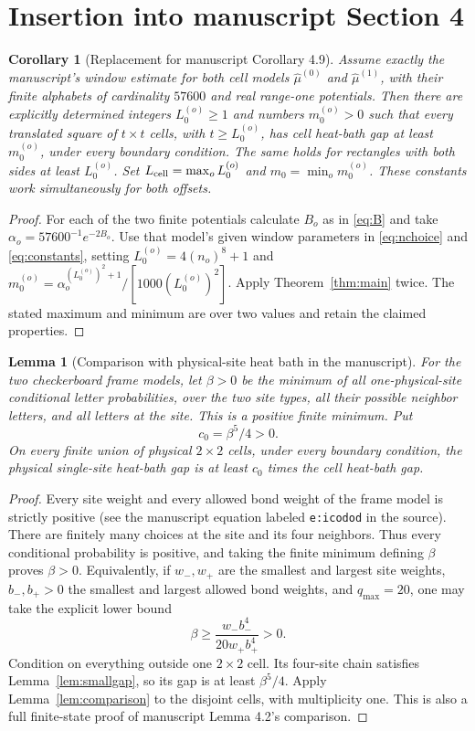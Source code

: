 \documentclass[11pt]{amsart}
\newtheorem{lemma}[theorem]{Lemma}
\newtheorem{corollary}[theorem]{Corollary}
\theoremstyle{definition}
\newcommand{\1}{\mathbf 1}
\begin{document}
\section{Insertion into manuscript Section 4}
\label{sec:application}

\begin{corollary}[Replacement for manuscript Corollary 4.9]
\label{cor:twooffsets}
Assume exactly the manuscript's window estimate for both cell models
$\widehat\mu^{(0)}$ and $\widehat\mu^{(1)}$, with their finite alphabets
of cardinality $57600$ and real range-one potentials.
Then there are explicitly determined integers $L_0^{(o)}\ge1$ and
numbers $m_0^{(o)}>0$ such that every translated square of $t\times t$
cells, with $t\ge L_0^{(o)}$, has cell heat-bath gap at least $m_0^{(o)}$,
under every boundary condition. The same holds for rectangles with both
sides at least $L_0^{(o)}$.
Set $L_{\rm cell}=\max_o L_0^{(o)}$ and
$m_0=\min_o m_0^{(o)}$. These constants work simultaneously for both
offsets.
\end{corollary}
\begin{proof}
For each of the two finite potentials calculate $B_o$ as in \eqref{eq:B}
and take $\alpha_o=57600^{-1}e^{-2B_o}$. Use that model's given window
parameters in \eqref{eq:nchoice} and \eqref{eq:constants}, setting
$L_0^{(o)}=4(n_o)^8+1$ and
$m_0^{(o)}=\alpha_o^{(L_0^{(o)})^2+1}/
[1000(L_0^{(o)})^2]$. Apply Theorem~\ref{thm:main} twice.
The stated maximum and minimum are over two values and retain the
claimed properties.
\end{proof}

\begin{lemma}[Comparison with physical-site heat bath in the manuscript]
\label{lem:physical}
For the two checkerboard frame models, let $\beta>0$ be the minimum of
all one-physical-site conditional letter probabilities, over the two site
types, all their possible neighbor letters, and all letters at the site.
This is a positive finite minimum. Put
\[
 c_0=\beta^5/4>0.
\]
On every finite union of physical $2\times2$ cells, under every boundary
condition, the physical single-site heat-bath gap is at least $c_0$ times
the cell heat-bath gap.
\end{lemma}
\begin{proof}
Every site weight and every allowed bond weight of the frame model is
strictly positive (see the manuscript equation labeled
\texttt{e:icodod} in the source). There are finitely many choices at the
site and its four neighbors. Thus every conditional probability is
positive, and taking the finite minimum defining $\beta$ proves
$\beta>0$. Equivalently, if $w_-,w_+$ are the smallest and largest site
weights, $b_-,b_+>0$ the smallest and largest allowed bond weights, and
$q_{\max}=20$, one may take the explicit lower bound
\[
 \beta\ge\frac{w_-b_-^4}{20w_+b_+^4}>0.
\]
Condition on everything outside one $2\times2$ cell. Its four-site chain
satisfies Lemma~\ref{lem:smallgap}, so its gap is at least $\beta^5/4$.
Apply Lemma~\ref{lem:comparison} to the disjoint cells, with multiplicity
one. This is also a full finite-state proof of manuscript Lemma 4.2's
comparison.
\end{proof}
\end{document}
